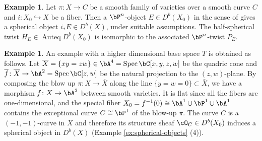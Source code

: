 \documentclass{amsart}
\numberwithin{equation}{section}
\theoremstyle{plain}
\theoremstyle{definition}
\newtheorem{example}[theorem]{Example}
\DeclareMathOperator{\Auteq}{\mathrm{Auteq}}
\DeclareMathOperator{\Spec}{\mathrm{Spec}}
\begin{document}
\begin{example}
    Let $\pi \colon X \to C$ be a smooth family of varieties over a smooth curve $C$ and $i \colon X_0 \hookrightarrow X$ be a fiber.
    Then a $\bP^n$-object $E \in D^b(X_0)$ in the sense of \cite{MR2200048} gives a spherical object $i_*E \in D^b(X)$, under suitable assumptions.
    The half-spherical twist $H_E \in \Auteq{D^b(X_0)}$ is isomorphic to the associated $\bP^n$-twist $P_E$.
\end{example}


\begin{example}\label{example_from_Atiyah_flop}
    An example with a higher dimensional base space $T$ is obtained as follows.
    Let $\overline{X} = \{xy=zw\} \in \bA^4 = \Spec \bC[x, y, z, w]$ be the quadric cone and $\overline{f} \colon \overline{X} \to \bA^2 = \Spec \bC[z, w]$ be the natural projection to the $(z, w)$-plane.
    By composing the blow up $\pi \colon X \to \overline{X}$ along the line $\{y=w=0\} \subset \bar{X}$, we have a morphism $f \colon X \to \bA^2$ between smooth varieties.
    It is flat since all the fibers are one-dimensional,
    and the special fiber $X_0=f^{-1}(0) \cong \bA^1 \cup \bP^1 \cup \bA^1$ contains
    the exceptional curve $C \cong \bP^1$ of the blow-up $\pi$.
    The curve $C$ is a $(-1, -1)$-curve in $X$ and therefore its structure sheaf $\cO_C \in D^b(X_0)$ induces a spherical object in $D^b(X)$ (Example \ref{ex:spherical-objects} (4)).
\end{example}
\end{document}
